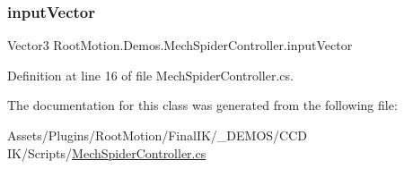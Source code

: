 \subsubsection{\texorpdfstring{input\+Vector}{inputVector}}
{\footnotesize\ttfamily Vector3 Root\+Motion.\+Demos.\+Mech\+Spider\+Controller.\+input\+Vector\hspace{0.3cm}{\ttfamily [get]}}



Definition at line 16 of file Mech\+Spider\+Controller.\+cs.



The documentation for this class was generated from the following file\+:\begin{DoxyCompactItemize}
\item 
Assets/\+Plugins/\+Root\+Motion/\+Final\+I\+K/\+\_\+\+D\+E\+M\+O\+S/\+C\+C\+D I\+K/\+Scripts/\mbox{\hyperlink{_mech_spider_controller_8cs}{Mech\+Spider\+Controller.\+cs}}\end{DoxyCompactItemize}
